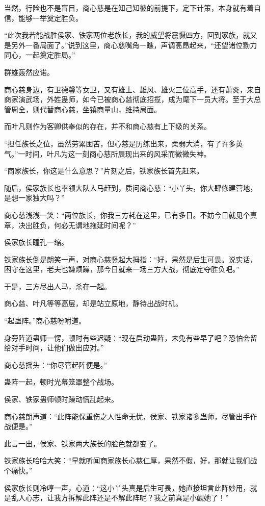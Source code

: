 \begin{this_body}
当然，行险也不是盲目，商心慈是在知己知彼的前提下，定下计策，本身就有着自信，能够一举奠定胜负。

“此次我若能战胜侯家、铁家两位老族长，我的威望将震慑四方，回到家族，就又是另外一番局面了。”说到这里，商心慈嘴角一瞧，声调高昂起来，“还望诸位勠力同心，一起奠定胜局。”

群雄轰然应诺。

商心慈身边，有卫德馨等女卫，又有雄土、雄风、雄火三位高手，还有萧炎，来自商家演武场，外姓蛊师，如今已被商心慈彻底招揽，成为麾下一员大将。至于大总管周全，则代替商心慈，坐镇商量山，维持局面。

而叶凡则作为客卿供奉似的存在，并不和商心慈有上下级的关系。

“担任族长之位，虽然劳累困苦，但心慈是历练出来，柔弱大消，有了许多英气。”一时间，叶凡为这一刻商心慈所展现出来的风采而微微失神。

“商家族长，你这是什么意思？”片刻之后，铁家族长首先赶来。

随后，侯家族长也率领大队人马赶到，质问商心慈：“小丫头，你大肆修建营地，是想一家独大吗？”

商心慈浅浅一笑：“两位族长，你我三方耗在这里，已有多日。不妨今日就见个真章，决出胜负，何必无谓地拖延时间呢？”

侯家族长瞳孔一缩。

铁家族长倒是朗笑一声，对商心慈竖起大拇指：“好，果然是后生可畏。说实话，困守在这里，老夫也嫌烦躁，那今日就来一场三方大战，彻底定夺胜负吧。”

于是，三方尽出人马，杀在一起。

商心慈、叶凡等等高层，却是站立原地，静待出战时机。

“起蛊阵。”商心慈吩咐道。

身旁阵道蛊师一愣，顿时有些迟疑：“现在启动蛊阵，未免有些早了吧？恐怕会留给对手时间，让他们做出应对。”

商心慈摇头：“你尽管起阵便是。”

蛊阵一起，顿时光幕笼罩整个战场。

侯家、铁家蛊师顿时躁动慌乱起来。

商心慈朗声道：“此阵能保重伤之人性命无忧，侯家、铁家诸多蛊师，尽管出手作战便是。”

此言一出，侯家、铁家两大族长的脸色就都变了。

铁家族长哈哈大笑：“早就听闻商家族长心慈仁厚，果然不假，好，那就让我们战个痛快。”

侯家族长则冷哼一声，心道：“这小丫头真是后生可畏，她直接坦言此阵妙用，就是乱人心志，让我方拆解此阵还是不解此阵呢？我之前真是小觑她了！”


\end{this_body}
